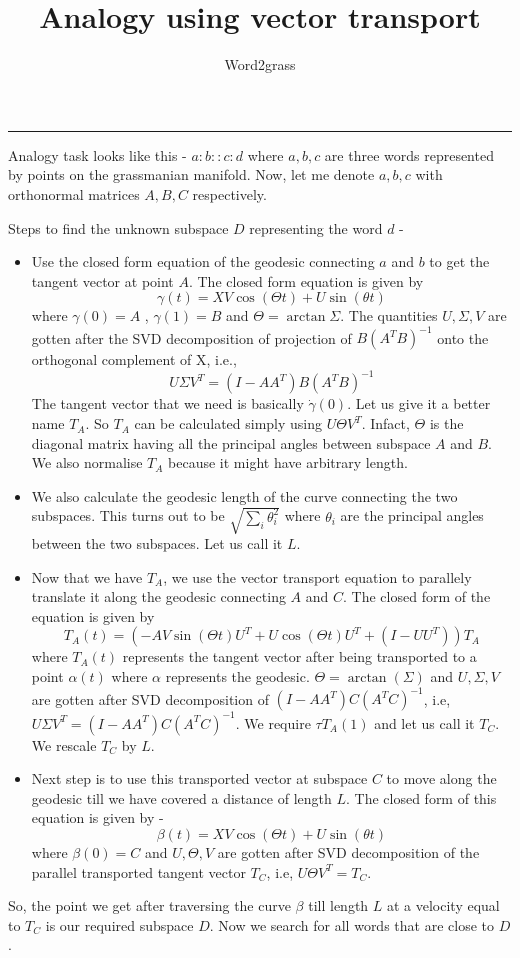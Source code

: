 \documentclass[a4paper,11pt]{article}
\title{Analogy using vector transport}
\author{Word2grass}
\begin{document}
\maketitle
\begin{center}
\rule{\textwidth}{1pt}
\end{center}

\noindent 
Analogy task looks like this - $a:b :: c:d$
where $a,b,c$ are three words represented by points on the grassmanian manifold. 
Now, let me denote $a,b,c$ with orthonormal matrices $A,B,C$ respectively.

\noindent Steps to find the unknown subspace $D$ representing the word $d$ - 

\begin{itemize}
  \item Use the closed form equation of the geodesic connecting $a$ and $b$ to get the tangent vector at point $A$. The closed form equation is given by 
  \[\gamma(t) = XV\cos(\Theta t) + U\sin(\theta t)\] where $\gamma(0)=A$ , $\gamma(1)=B$ and $\Theta = \arctan{\Sigma}$. The quantities $U,\Sigma, V$ are gotten after the SVD decomposition of projection of $B(A^TB)^{-1}$ onto the orthogonal complement of X, i.e.,
  \[U\Sigma V^T = (I - AA^T)B(A^TB)^{-1}\]
  The tangent vector that we need is basically $\dot \gamma(0)$. Let us give it a better name $T_A$. So $T_A$ can be calculated simply using $U \Theta V^T$. Infact, $\Theta$ is the diagonal matrix having all the principal angles between subspace $A$ and $B$. 
  We also normalise $T_A$ because it might have arbitrary length.
  \item We also calculate the geodesic length of the curve connecting the two subspaces. This turns out to be $\sqrt{\sum_i \theta_i^{2}}$ where $\theta_i$ are the principal angles between the two subspaces. Let us call it $L$.
  \item Now that we have $T_A$, we use the vector transport equation to parallely translate it along the geodesic connecting $A$ and $C$. The closed form of the equation is given by 
  \[T_A(t) = (-AV \sin(\Theta t)U^T + U\cos (\Theta t)U^T + (I - UU^T))T_A \] where $T_A(t)$ represents the tangent vector after being transported to a point $\alpha(t)$ where $\alpha$ represents the geodesic. $\Theta = \arctan(\Sigma)$ and $U,\Sigma, V $ are gotten after SVD decomposition of $(I - AA^T)C(A^TC)^{-1}$, i.e, $U \Sigma V^T = (I - AA^T)C(A^TC)^{-1}$. We require $\tau T_A(1)$ and let us call it $T_C$.
  We rescale $T_C$ by $L$.  
  \item Next step is to use this transported vector at subspace $C$ to move along the geodesic till we have covered a distance of length $L$. The closed form of this equation is given by - 
  \[\beta(t) = XV\cos(\Theta t) + U\sin(\theta t) \] where $\beta(0) = C$ and $U,\Theta, V$ are gotten after SVD decomposition of the parallel transported tangent vector $T_C$, i.e, $U\Theta V^T = T_{C}$.
\end{itemize}

\noindent So, the point we get after traversing the curve $\beta$ till length $L$ at a velocity equal to $T_{C}$ is our required subspace $D$. Now we search for all words that are close to $D$.
\end{document}
